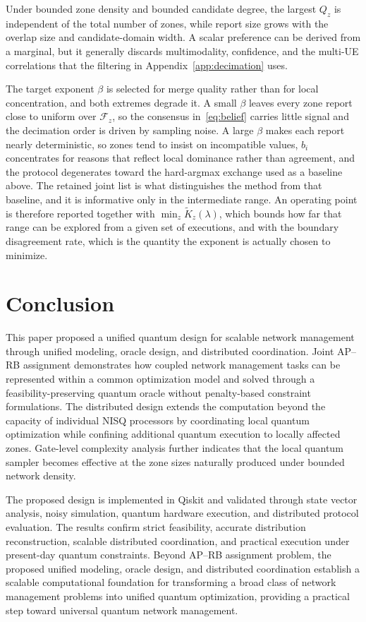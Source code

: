 \documentclass[journal]{IEEEtran}
\newcommand{\calF}{\mathcal{F}}  %
\begin{document}
Under bounded zone density and bounded candidate degree, the largest $Q_z$ is independent of the total number of zones, while report size grows with the overlap size and candidate-domain width. A scalar preference can be derived from a marginal, but it generally discards multimodality, confidence, and the multi-UE correlations that the filtering in Appendix~\ref{app:decimation} uses.

The target exponent $\beta$ is selected for merge quality rather than for local concentration, and both extremes degrade it. A small $\beta$ leaves every zone report close to uniform over $\calF_z$, so the consensus in~\eqref{eq:belief} carries little signal and the decimation order is driven by sampling noise. A large $\beta$ makes each report nearly deterministic, so zones tend to insist on incompatible values, $b_i$ concentrates for reasons that reflect local dominance rather than agreement, and the protocol degenerates toward the hard-argmax exchange used as a baseline above. The retained joint list is what distinguishes the method from that baseline, and it is informative only in the intermediate range. An operating point is therefore reported together with $\min_z\widetilde{K}_z(\lambda)$, which bounds how far that range can be explored from a given set of executions, and with the boundary disagreement rate, which is the quantity the exponent is actually chosen to minimize.

{\color{violet}
\section{Conclusion}
\label{sec:conclusion}

This paper proposed a unified quantum design for scalable network management through unified modeling, oracle design, and distributed coordination. Joint AP–RB assignment demonstrates how coupled network management tasks can be represented within a common optimization model and solved through a feasibility-preserving quantum oracle without penalty-based constraint formulations. The distributed design extends the computation beyond the capacity of individual NISQ processors by coordinating local quantum optimization while confining additional quantum execution to locally affected zones. Gate-level complexity analysis further indicates that the local quantum sampler becomes effective at the zone sizes naturally produced under bounded network density.

The proposed design is implemented in Qiskit and validated through state vector analysis, noisy simulation, quantum hardware execution, and distributed protocol evaluation. The results confirm strict feasibility, accurate distribution reconstruction, scalable distributed coordination, and practical execution under present-day quantum constraints. Beyond AP–RB assignment problem, the proposed unified modeling, oracle design, and distributed coordination establish a scalable computational foundation for transforming a broad class of network management problems into unified quantum optimization, providing a practical step toward universal quantum network management.
}
\end{document}

